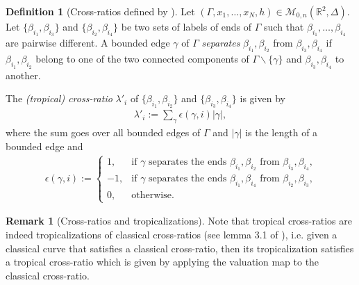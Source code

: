 \documentclass[11pt,reqno,a4]{amsart}
\theoremstyle{dotless}
\theoremstyle{definition}
\newtheorem{definition}[corollary]{Definition}
\newtheorem{remark}[corollary]{Remark}
\begin{document}
\begin{definition}[Cross-ratios defined by \cite{MikhalkinCRC,IlyaCRC}]\label{definition:cross-ratios_Ilya}
Let $(\Gamma,x_1,\dots,x_N,h)\in \mathcal{M}_{0,n}\left(\mathbb{R}^2,\Delta\right)$. Let $\lbrace \beta_{i_1},\beta_{i_3}\rbrace$ and $\lbrace \beta_{i_2},\beta_{i_4}\rbrace$ be two sets of labels of ends of $\Gamma$ such that $\beta_{i_1},\dots,\beta_{i_4}$ are pairwise different. A bounded edge $\gamma$ of $\Gamma$ \textit{separates} $\beta_{i_1},\beta_{i_2}$ from $\beta_{i_3},\beta_{i_4}$ if $\beta_{i_1},\beta_{i_2}$ belong to one of the two connected components of $\Gamma\backslash \lbrace \gamma\rbrace$ and $\beta_{i_3},\beta_{i_4}$ to another.

The \textit{(tropical) cross-ratio} $\lambda'_i$ of $\lbrace \beta_{i_1},\beta_{i_2}\rbrace$ and $\lbrace \beta_{i_3},\beta_{i_4}\rbrace$ is given by
\begin{align*}
\lambda'_i:=\sum_\gamma \epsilon(\gamma,i)|\gamma|,
\end{align*}
where the sum goes over all bounded edges of $\Gamma$ and $|\gamma|$ is the length of a bounded edge and
\begin{align*}
\epsilon(\gamma,i):=
\begin{cases}
      1, & \text{if $\gamma$ separates the ends $\beta_{i_1},\beta_{i_2}$ from $\beta_{i_3},\beta_{i_4}$,} \\
      -1, & \text{if $\gamma$ separates the ends $\beta_{i_1},\beta_{i_4}$ from $\beta_{i_2},\beta_{i_3}$,} \\
      0, & \text{otherwise.}
\end{cases}
\end{align*}
\end{definition}

\begin{remark}[Cross-ratios and tropicalizations]\label{remark:tropicalized_cross-ratios}
Note that tropical cross-ratios are indeed tropicalizations of classical cross-ratios (see lemma 3.1 of \cite{IlyaCRC}), i.e. given a classical curve that satisfies a classical cross-ratio, then its tropicalization satisfies a tropical cross-ratio which is given by applying the valuation map to the classical cross-ratio. 
\end{remark}
\end{document}
